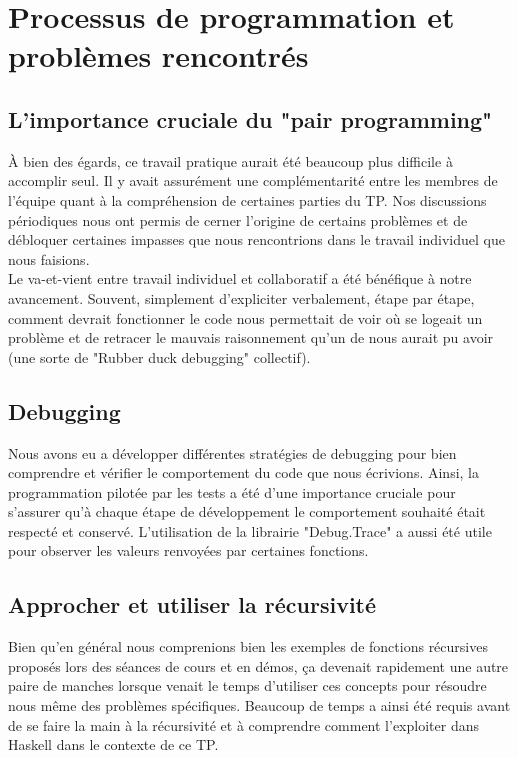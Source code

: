 \documentclass[11pt, letterpaper]{article}
\begin{document}
\section{Processus de programmation et problèmes rencontrés}

\subsection{L'importance cruciale du "pair programming"}
À bien des égards, ce travail pratique aurait été beaucoup plus difficile à accomplir seul. Il y avait assurément une complémentarité entre les membres de l'équipe quant à la compréhension de certaines parties du TP. Nos discussions périodiques nous ont permis de cerner l'origine de certains problèmes et de débloquer certaines impasses que nous rencontrions dans le travail individuel que nous faisions. \\

Le va-et-vient entre travail individuel et collaboratif a été bénéfique à notre avancement. Souvent, simplement d'expliciter verbalement, étape par étape, comment devrait fonctionner le code nous permettait de voir où se logeait un problème et de retracer le mauvais raisonnement qu'un de nous aurait pu avoir (une sorte de "Rubber duck debugging" collectif).

\subsection{Debugging}
Nous avons eu a développer différentes stratégies de debugging pour bien comprendre et vérifier le comportement du code que nous écrivions. Ainsi, la programmation pilotée par les tests a été d'une importance cruciale pour s'assurer qu'à chaque étape de développement le comportement souhaité était respecté et conservé. L'utilisation de la librairie "Debug.Trace" a aussi été utile pour observer les valeurs renvoyées par certaines fonctions.

\subsection{Approcher et utiliser la récursivité}
Bien qu'en général nous comprenions bien les exemples de fonctions récursives proposés lors des séances de cours et en démos, ça devenait rapidement une autre paire de manches lorsque venait le temps d'utiliser ces concepts pour résoudre nous même des problèmes spécifiques. Beaucoup de temps a ainsi été requis avant de se faire la main à la récursivité et à comprendre comment l'exploiter dans Haskell dans le contexte de ce TP.
\end{document}
